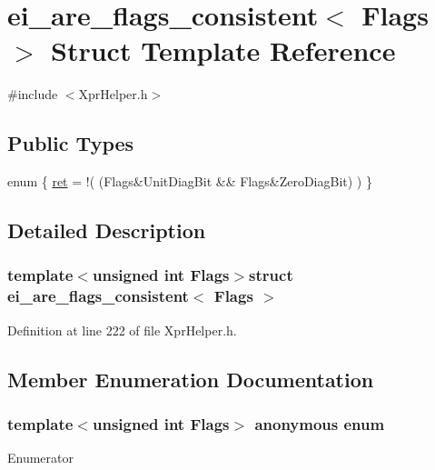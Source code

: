 \hypertarget{structei__are__flags__consistent}{\section{ei\-\_\-are\-\_\-flags\-\_\-consistent$<$ Flags $>$ Struct Template Reference}
\label{structei__are__flags__consistent}
}


{\ttfamily \#include $<$Xpr\-Helper.\-h$>$}

\subsection*{Public Types}
\begin{DoxyCompactItemize}
\item 
enum \{ \hyperlink{structei__are__flags__consistent_a8dbf6d69b21ae42791ab8ca6643b52eca520a7725966c0d413e681d0ee487dd6f}{ret} = !( (Flags\&Unit\-Diag\-Bit \&\& Flags\&Zero\-Diag\-Bit) )
 \}
\end{DoxyCompactItemize}


\subsection{Detailed Description}
\subsubsection*{template$<$unsigned int Flags$>$struct ei\-\_\-are\-\_\-flags\-\_\-consistent$<$ Flags $>$}



Definition at line 222 of file Xpr\-Helper.\-h.



\subsection{Member Enumeration Documentation}
\hypertarget{structei__are__flags__consistent_a8dbf6d69b21ae42791ab8ca6643b52ec}{\subsubsection[{anonymous enum}]{\setlength{\rightskip}{0pt plus 5cm}template$<$unsigned int Flags$>$ anonymous enum}}\label{structei__are__flags__consistent_a8dbf6d69b21ae42791ab8ca6643b52ec}
\begin{Desc}
\item[Enumerator]\par
\begin{description}
\item[{\em 
\hypertarget{structei__are__flags__consistent_a8dbf6d69b21ae42791ab8ca6643b52eca520a7725966c0d413e681d0ee487dd6f}{ret}\label{structei__are__flags__consistent_a8dbf6d69b21ae42791ab8ca6643b52eca520a7725966c0d413e681d0ee487dd6f}
}]\end{description}
\end{Desc}


